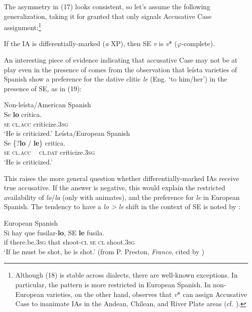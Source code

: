\documentclass[output=paper]{langsci/langscibook}
\begin{document}
The asymmetry in (17) looks consistent, so let’s assume the following generalization, taking it for granted that only \DOM signals Accusative Case assignment:\footnote{Although (18) is stable across dialects, there are well-known exceptions. In particular, the pattern is more restricted in European Spanish. In non-European varieties, on the other hand, \citet[§41.12m]{RAE-ASALE2009} observes that \textit{v}* can assign Accusative Case to inanimate IAs in the Andean, Chilean, and River Plate areas (cf. \citealt{Gallego2016}).}

\ea%
\label{ex:gallego:18}
If the IA is differentially-marked (\textit{a} XP), then SE \textit{v} is \textit{v}* ($\varphi $-complete).
\z

          

An interesting piece of evidence indicating that accusative Case may not be at play even in the presence of \DOM comes from the observation that leísta varieties of Spanish show a preference for the dative clitic \textit{le} (Eng. ‘to him\slash her’) in the presence of SE, as in (19):

\ea%
    \ea
    Non-leísta/American Spanish\label{ex:gallego:19}\\
    \gll Se  \textbf{lo}       critica.          \\
              \textsc{se}  \textsc{cl.acc} criticize\textsc{{}.3}\textsc{sg}\\
    \glt      ‘He is criticized.’
    \ex Leísta/European Spanish\\
    \gll Se \{?\textbf{lo}    /    \textbf{le}\}       critica.      \\
                 \textsc{se}   \textsc{cl.acc} ~ \textsc{cl.dat}   criticize\textsc{{}.3}\textsc{sg}\\
    \glt      ‘He is criticized.’
    \z
\z   

This raises the more general question whether differentially-marked IAs receive true accusative. If the answer is negative, this would explain the restricted availability of \textit{lo}/\textit{la} (only with animates), and the preference for \textit{le} in European Spanish. The tendency to have a \textit{lo > le} shift in the context of SE is noted by \citet{Ordóñez2004}:

\ea%
    European Spanish\label{ex:gallego:20}\\
    \gll Si hay                 que  fusilar-\textbf{lo},  SE \textbf{le} fusila.\\
        if  there.be\textsc{{}.3}\textsc{sg}  that  shoot\textsc{{}-cl}  \textsc{se}  \textsc{cl}  shoot\textsc{{}.3}\textsc{sg}\\
    \glt ‘If he must be shot, he is shot.’ (from P. Preston, \textit{Franco}, cited by \citealt{Ordóñez2004})
    \z
\end{document}
